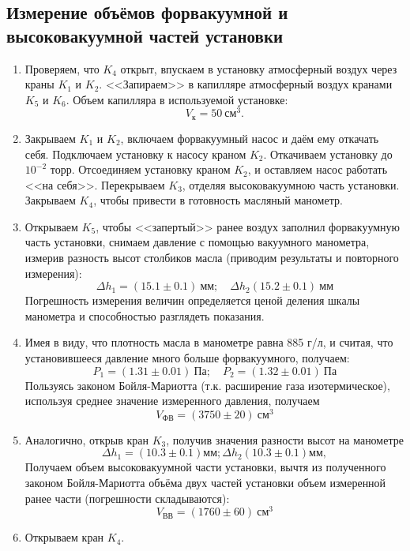 \documentclass[12pt,a4paper]{article}
\begin{document}
\subsection*{Измерение объёмов форвакуумной и высоковакуумной частей установки}
	\begin{enumerate}
		\item Проверяем, что $K_4$ открыт, впускаем в установку атмосферный воздух через краны $K_1$ и $K_2$. <<Запираем>> в капилляре атмосферный воздух кранами $K_5$ и $K_6$. Объем капилляра в используемой установке: $$V_\text{к} = 50~ \text{см}^3.$$
		\item Закрываем $K_1$ и $K_2$, включаем форвакуумный насос и даём ему откачать себя. Подключаем установку к насосу краном $K_2$. Откачиваем установку до $10^{-2}$ торр. Отсоединяем установку краном $K_2$, и оставляем насос работать <<на себя>>. Перекрываем  $K_3$, отделяя высоковакуумною часть установки. Закрываем  $K_4$, чтобы привести в готовность масляный манометр.
		\item Открываем  $K_5$, чтобы <<запертый>> ранее воздух заполнил форвакуумную часть установки, снимаем давление с помощью вакуумного манометра, измерив разность высот столбиков масла (приводим результаты и повторного измерения):
		$$
		\Delta h_1 = (15.1\pm0.1) ~\text{мм};\quad \Delta h_2 (15.2\pm0.1) ~\text{мм}
		$$
		Погрешность измерения величин определяется ценой деления шкалы манометра и способностью разглядеть показания.
		\item Имея в виду, что плотность масла в манометре равна 885 г/л, и считая, что установившееся давление много больше форвакуумного, получаем:
		$$
		P_1 = (1.31\pm0.01)~\text{Па};\quad P_2 = (1.32\pm0.01)~\text{Па}
		$$
		Пользуясь законом Бойля-Мариотта (т.к. расширение газа изотермическое), используя среднее значение измеренного давления, получаем
		$$
		V_\text{ФВ} = (3750\pm20)~\text{см}^3
		$$
		\item Аналогично, открыв кран $K_3$, получив значения разности высот на манометре
		$$
		\Delta h_1 = (10.3\pm0.1) \text{мм}; \Delta h_2 (10.3\pm0.1) \text{мм},
		$$
		Получаем объем высоковакуумной части установки, вычтя из полученного законом Бойля-Мариотта объёма двух частей установки объем измеренной ранее части (погрешности складываются):
		$$
		V_\text{ВВ} = (1760\pm60)~\text{см}^3
		$$
		\item Открываем кран $K_4$.
	\end{enumerate}
\end{document}
